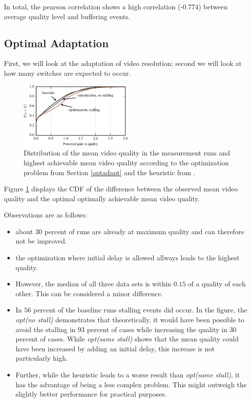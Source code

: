 In total, the pearson correlation shows a high correlation (-0.774) between average quality level and buffering events.

\subsection{Optimal Adaptation}

First, we will look at the adaptation of video resolution; second we will look at how many switches are expected to occur.

\begin{figure}[t]
\centering
\includegraphics[width=0.5\textwidth]{figs/qualitygain_py}%
\caption{Distribution of the mean video quality in the measurement runs and highest achievable mean video quality according to the optimization problem from Section \ref{optadapt} and the heuristic from \cite{sieber16sacrificing}.}
\label{fig:opt}%
\end{figure}

Figure \ref{fig:opt} displays the CDF of the difference between the observed mean video quality and the optimal optimally achievable mean video quality.

Observations are as follows:
\begin{itemize}
\item about $30$ percent of runs are already at maximum quality and can therefore not be improved.
\item the optimization where initial delay is allowed allways leads to the highest quality.
\item However, the median of all three data sets is within $0.15$ of a quality of each other. This can be considered a minor difference.
\item In $56$ percent of the baseline runs stalling events did occur. In the figure, the \textit{opt(no stall)} demonstrates that theoretically, it would have been possible to avoid the stalling in $93$ percent of cases while increasing the quality in $30$ percent of cases. While \textit{opt(same stall)} shows that the mean quality could have been increased by adding an initial delay, this increase is not particularly high.
\item Further, while the heuristic leads to a worse result than \textit{opt(same stall)}, it has the advantage of being a less complex problem. This might outweigh the slightly better performance for practical purposes.
\end{itemize}

